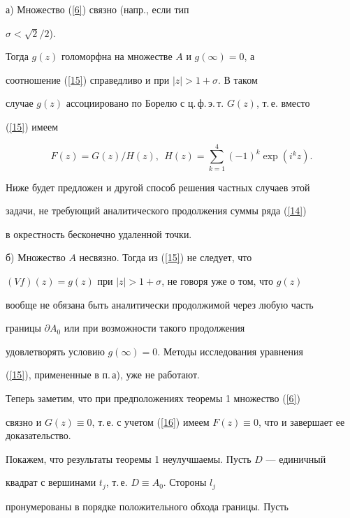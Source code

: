 а) Множество (\ref{6}) связно (напр., если тип 


$\sigma<\sqrt2/2$).


Тогда $g(z)$ голоморфна на множестве $A$ и $g(\infty)=0$, а


соотношение (\ref{15}) справедливо и при $|z|>1+\sigma$. В таком


случае $g(z)$ ассоциировано по Борелю с ц.\,ф.\,э.\,т. $G(z)$, т.\,е. вместо


(\ref{15}) имеем


\begin{equation}\label{16}


F(z)=G(z)/H(z),\ \ H(z)=\sum_{k=1}^4 (-1)^k\exp(i^kz).


\end{equation}


Ниже будет предложен и другой способ решения частных случаев этой


задачи, не требующий аналитического продолжения суммы ряда (\ref{14})


в окрестность бесконечно удаленной точки.





б) Множество $A$ несвязно. Тогда из (\ref{15}) не следует, что


$(Vf)(z)=g(z)$ при $|z|>1+\sigma$, не говоря уже о том, что $g(z)$


вообще не обязана быть аналитически продолжимой через любую часть


границы $\partial A_0$ или при возможности такого продолжения


удовлетворять условию $g(\infty)=0$. Методы исследования уравнения


(\ref{15}), примененные в п.\,а), уже не работают.





Теперь заметим, что при предположениях теоремы 1 множество (\ref{6})


связно и $G(z)\equiv 0$, т.\,е. с учетом (\ref{16}) имеем $F(z)\equiv


0$, что и завершает ее доказательство.





Покажем, что результаты теоремы 1 неулучшаемы. Пусть $D$ --- единичный


квадрат с вершинами $t_j$, т.\,е. $D\equiv A_0$. Стороны $l_j$


пронумерованы в порядке положительного обхода границы. Пусть


